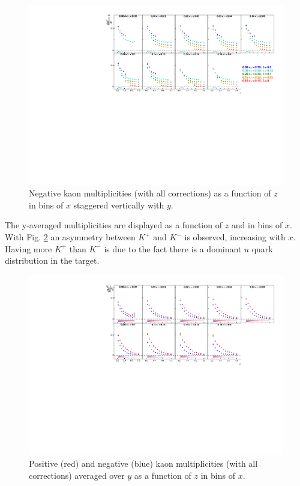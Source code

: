 \begin{figure}[!h]
  \centering
	\includegraphics[scale=0.85]{./gfx/Km.pdf}
	\caption{Negative kaon multiplicities (with all corrections) as a function of $z$ in bins of $x$ staggered vertically with $y$.}
	\label{pic:mkm}
\end{figure}

The y-averaged multiplicities are displayed as a function of $z$ and in bins of $x$. With Fig. \ref{pic:mkyavg} an asymmetry between $K^+$ and $K^-$ is observed, increasing with $x$. Having more $K^+$ than $K^-$ is due to the fact there is a dominant $u$ quark distribution in the target.

\begin{figure}[!h]
  \centering
	\includegraphics[scale=0.85]{./gfx/Kyavg.pdf}
	\caption{Positive (red) and negative (blue) kaon multiplicities (with all corrections) averaged over $y$ as a function of $z$ in bins of $x$.}
	\label{pic:mkyavg}
\end{figure}


